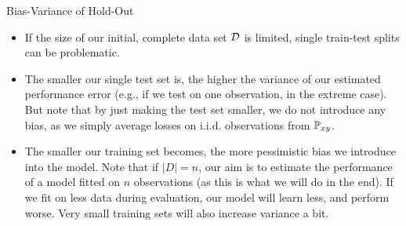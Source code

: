 \documentclass[11pt,compress,t,notes=noshow, xcolor=table]{beamer}
\begin{document}

\begin{vbframe}{Bias-Variance of Hold-Out}
\begin{itemize}
\item If the size of our initial, complete data set $\mathcal{D}$ is limited,
  single train-test splits can be problematic.
\item The smaller our single test set is, the higher the variance
  of our estimated performance error (e.g., if we test on one observation, in the extreme case).
  But note that by just making the test set smaller, we do not introduce any bias,
  as we simply average losses on i.i.d. observations from $\mathbb{P}_{xy}$.
\item The smaller our training set becomes, the more pessimistic bias we introduce into the model.
  Note that if $|D| = n$, our aim is to estimate the performance of a model fitted
  on $n$ observations (as this is what we will do in the end). If we fit on less data during
  evaluation, our model will learn less, and perform worse. Very small training sets will also
  increase variance a bit.
\end{itemize}
\end{vbframe}
\end{document}
